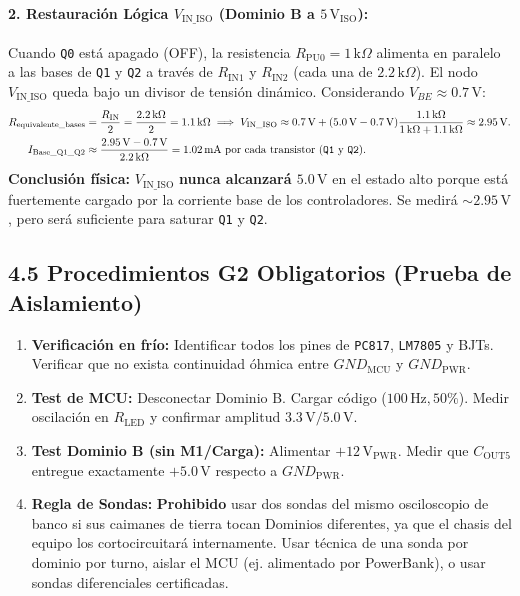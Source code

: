 \documentclass[10pt, a4paper, landscape]{article}
\begin{document}
\paragraph{2. Restauración Lógica $V_{\text{IN\_ISO}}$ (Dominio B a $5\,\text{V}_{\text{ISO}}$):}
Cuando \texttt{Q0} está apagado (OFF), la resistencia $R_{\text{PU0}} = 1\,\text{k}\Omega$ alimenta en paralelo a las bases de \texttt{Q1} y \texttt{Q2} a través de $R_{\text{IN1}}$ y $R_{\text{IN2}}$ (cada una de $2.2\,\text{k}\Omega$). El nodo $V_{\text{IN\_ISO}}$ queda bajo un divisor de tensión dinámico. Considerando $V_{BE} \approx 0.7\,\text{V}$:
\begin{align*}
    R_{\text{equivalente\_bases}} &= \frac{R_{\text{IN}}}{2} = \frac{2.2\,\text{k}\Omega}{2} = 1.1\,\text{k}\Omega \implies V_{\text{IN\_ISO}} \approx 0.7\,\text{V} + (5.0\,\text{V} - 0.7\,\text{V}) \frac{1.1\,\text{k}\Omega}{1\,\text{k}\Omega + 1.1\,\text{k}\Omega} \approx 2.95\,\text{V}. \\
    I_{\text{Base\_Q1\_Q2}} &\approx \frac{2.95\,\text{V} - 0.7\,\text{V}}{2.2\,\text{k}\Omega} = 1.02\,\text{mA} \text{ por cada transistor (\texttt{Q1} y \texttt{Q2})}. 
\end{align*}
\textbf{Conclusión física:} $V_{\text{IN\_ISO}}$ \textbf{nunca alcanzará $5.0\,\text{V}$} en el estado alto porque está fuertemente cargado por la corriente base de los controladores. Se medirá $\sim 2.95\,\text{V}$, pero será suficiente para saturar \texttt{Q1} y \texttt{Q2}.

\subsection*{4.5 Procedimientos G2 Obligatorios (Prueba de Aislamiento)}
\begin{enumerate}[noitemsep, topsep=2pt]
    \item \textbf{Verificación en frío:} Identificar todos los pines de \texttt{PC817}, \texttt{LM7805} y BJTs. Verificar que no exista continuidad óhmica entre $GND_{\text{MCU}}$ y $GND_{\text{PWR}}$.
    \item \textbf{Test de MCU:} Desconectar Dominio B. Cargar código ($100\,\text{Hz}, 50\%$). Medir oscilación en $R_{\text{LED}}$ y confirmar amplitud $3.3\,\text{V}/5.0\,\text{V}$.
    \item \textbf{Test Dominio B (sin M1/Carga):} Alimentar $+12\,\text{V}_{\text{PWR}}$. Medir que $C_{\text{OUT5}}$ entregue exactamente $+5.0\,\text{V}$ respecto a $GND_{\text{PWR}}$. 
    \item \textbf{Regla de Sondas:} \textbf{Prohibido} usar dos sondas del mismo osciloscopio de banco si sus caimanes de tierra tocan Dominios diferentes, ya que el chasis del equipo los cortocircuitará internamente. Usar técnica de una sonda por dominio por turno, aislar el MCU (ej. alimentado por PowerBank), o usar sondas diferenciales certificadas.
\end{enumerate}
\end{document}
